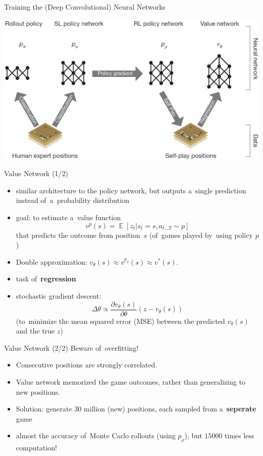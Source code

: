 \documentclass{beamer}
\newcommand{\E}{\mathop{\mathbb{E}}}
\begin{document}
{    \begin{frame}{Training the (Deep Convolutional) Neural Networks}
      \begin{center}
        \includegraphics[width=\textwidth]{../img/neural_nets_pipeline.png}
      \end{center}
    \end{frame}

    \begin{frame}{Value Network (1/2)}
      \begin{itemize}[<+- | alert@+>]
        \item similar architecture to the policy network, but outputs a~single prediction instead of~a~probability distribution
        \item goal: to estimate a~value function
          \[
            v^p(s) = \E [z_t | s_t = s, a_{t \dots T} \sim p]
          \]
          that predicts the outcome from position~$s$ (of~games played by~using policy $p$)
        \item Double approximation: $v_\theta(s) \approx v^{p_\rho}(s) \approx v^*(s)$.
        \item task of~\textbf{regression}
        \item stochastic gradient descent:
          \[
            \Delta \theta \propto \frac{\partial v_\theta (s)}{\partial \theta} (z - v_\theta(s))
          \]
          {\tiny (to~minimize the mean squared error (MSE) between the predicted $v_\theta(s)$ and the true $z$)}
      \end{itemize}
    \end{frame}

    \begin{frame}{Value Network (2/2)}
      Beware of~overfitting!
      \pause
      \begin{itemize}[<+- | alert@+>]
        \item Consecutive positions are strongly correlated.
        \item Value network memorized the game outcomes, rather than generalizing to new positions.
        \item Solution: generate 30 million (new) positions, each sampled from a~\textbf{seperate} game
        \item almost the accuracy of~Monte Carlo rollouts (using $p_\rho$), but $15000$ times less computation!
      \end{itemize}
    \end{frame}

}
\end{document}
